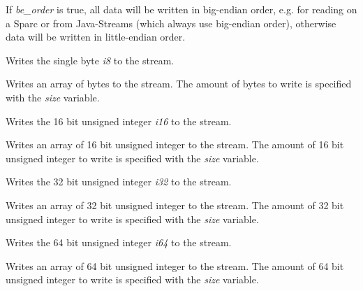 
If {\it be\_order} is true, all data will be written in big-endian
order, e.g. for reading on a Sparc or from Java-Streams (which
always use big-endian order), otherwise data will be written in
little-endian order.
 


Writes the single byte {\it i8} to the stream.


Writes an array of bytes to the stream. The amount of bytes to write is
specified with the {\it size} variable.



Writes the 16 bit unsigned integer {\it i16} to the stream.


Writes an array of 16 bit unsigned integer to the stream. The amount of
16 bit unsigned integer to write is specified with the {\it size} variable.



Writes the 32 bit unsigned integer {\it i32} to the stream.


Writes an array of 32 bit unsigned integer to the stream. The amount of
32 bit unsigned integer to write is specified with the {\it size} variable.



Writes the 64 bit unsigned integer {\it i64} to the stream.


Writes an array of 64 bit unsigned integer to the stream. The amount of
64 bit unsigned integer to write is specified with the {\it size} variable.

